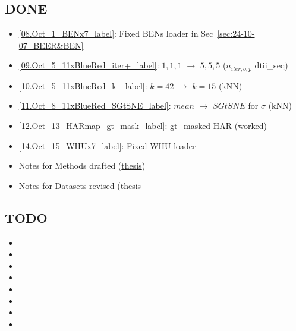 

\begin{multicols}{2}
\subsection*{DONE}
\begin{itemize}
    \item \ref{08.Oct_1_BENx7_label}: Fixed BENs loader in Sec~\ref{sec:24-10-07_BEER&BEN}
    \item \ref{09.Oct_5_11xBlueRed_iter+_label}: $1,1,1$ $\rightarrow$ $5,5,5$ ($n_{iter, o, p}$ dtii\_seq)
    \item \ref{10.Oct_5_11xBlueRed_k-_label}: $k=42$ $\rightarrow$ $k=15$ (kNN)
    \item \ref{11.Oct_8_11xBlueRed_SGtSNE_label}: $mean$ $\rightarrow$ $SGtSNE$ for $\sigma$ (kNN)
    \item \ref{12.Oct_13_HARmap_gt_mask_label}: gt\_masked HAR (worked)
    \item \ref{14.Oct_15_WHUx7_label}: Fixed WHU loader
    \item Notes for Methods drafted (\href{https://gitlab.oit.duke.edu/jw853/clustering4hsi_thesis}{thesis})
    \item Notes for Datasets revised (\href{https://gitlab.oit.duke.edu/jw853/clustering4hsi_thesis}{thesis}
\end{itemize}

\subsection*{TODO}
\begin{itemize}
    \item {}
    \item {}
    \item {}
    \item 
    \item 
    \item 
    \item 
    \item {}
\end{itemize}
\end{multicols}

\newpage

